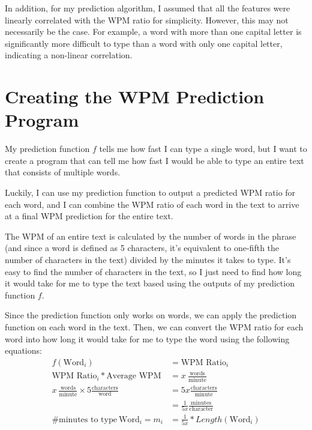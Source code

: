 \documentclass[12pt]{article}
\begin{document}
In addition, for my prediction algorithm, I assumed that all the features were linearly correlated with the WPM ratio for simplicity. However, this may not necessarily be the case. For example, a word with more than one capital letter is significantly more difficult to type than a word with only one capital letter, indicating a non-linear correlation.

\section*{Creating the WPM Prediction Program}

My prediction function $f$ tells me how fast I can type a single word, but I want to create a program that can tell me how fast I would be able to type an entire text that consists of multiple words.

Luckily, I can use my prediction function to output a predicted WPM ratio for each word, and I can combine the WPM ratio of each word in the text to arrive at a final WPM prediction for the entire text.

The WPM of an entire text is calculated by the number of words in the phrase (and since a word is defined as 5 characters, it's equivalent to one-fifth the number of characters in the text) divided by the minutes it takes to type. It's easy to find the number of characters in the text, so I just need to find how long it would take for me to type the text based using the outputs of my prediction function $f$.

Since the prediction function only works on words, we can apply the prediction function on each word in the text. Then, we can convert the WPM ratio for each word into how long it would take for me to type the word using the following equations:
\begin{align*}
	f(\text{Word}_i)                                                                    & = \text{WPM Ratio}_i
	\\
	\text{WPM Ratio}_i * \text{Average WPM}                                             & = x~\frac{\text{words}}{\text{minute}}
	\\
	x~\frac{\text{words}}{\text{minute}} \times 5 \frac{\text{characters}}{\text{word}} & = 5x \frac{\text{characters}}{\text{minute}}
	\\
	                                                                                    & = \frac{1}{5x} \frac{\text{minutes}}{\text{character}}
	\\
	\text{\# minutes to type}~\text{Word}_i = m_i                                       & = \frac{1}{5x} * Length(\text{Word}_i)
\end{align*}
\end{document}

